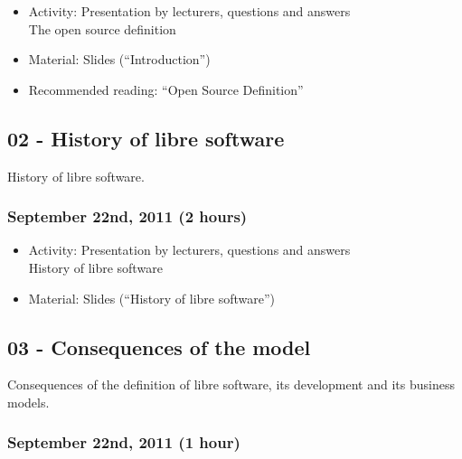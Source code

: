 \documentclass[a4paper]{article}
\begin{document}
\begin{itemize}
\item Activity: Presentation by lecturers, questions and answers \\
  The open source definition
\item Material: Slides (``Introduction'')
\item Recommended reading: ``Open Source Definition''
\end{itemize}

\subsection{02 - History of libre software}

History of libre software.

\subsubsection{September 22nd, 2011 (2 hours)}

\begin{itemize}
\item Activity: Presentation by lecturers, questions and answers \\
  History of libre software
\item Material: Slides (``History of libre software'')
\end{itemize}

\subsection{03 - Consequences of the model}

Consequences of the definition of libre software, its development and its business models.


\subsubsection{September 22nd, 2011 (1 hour)}
\end{document}
